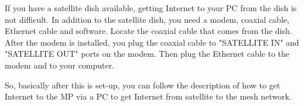 If you have a satellite dish available, getting Internet to your PC from the dish is not difficult. In addition to the satellite dish, you need a modem, coaxial cable, Ethernet cable and software. Locate the coaxial cable that comes from the dish. After the modem is installed, you plug the coaxial cable to "SATELLITE IN" and "SATELLITE OUT" ports on the modem. Then plug the Ethernet cable to the modem and to your computer. 

So, basically after this is set-up, you can follow the description of how to get Internet to the MP via a PC to get Internet from satellite to the mesh network. 